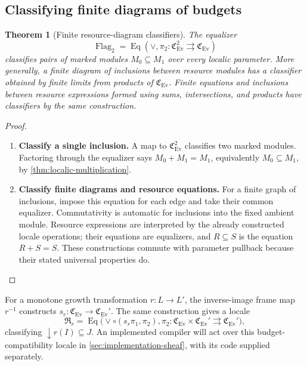 \documentclass[11pt,a4paper]{article}
\numberwithin{algorithm}{section}
\numberwithin{equation}{section}
\newtheorem{theorem}{Theorem}[section]
\theoremstyle{definition}
\theoremstyle{remark}
\theoremstyle{plain}
\newcommand{\Ev}{{\operatorname{Ev}}}
\newcommand{\Cplx}{\mathfrak C_{\Ev}}
\theoremstyle{definition}
\theoremstyle{plain}
\begin{document}
\subsection{Classifying finite diagrams of budgets}
\label{sec:budget-diagrams-moduli}
\begin{theorem}[Finite resource-diagram classifiers]
\label{thm:budget-flags}
The equalizer
\[
 \operatorname{Flag}_2=\operatorname{Eq}
   (\vee,\pi_2:\Cplx^2\rightrightarrows\Cplx)
\]
classifies pairs of marked modules $M_0\subseteq M_1$ over every
localic parameter. More generally, a finite diagram of inclusions
between resource modules has a classifier obtained by finite
limits from products of $\Cplx$. Finite equations and inclusions
between resource expressions formed using sums, intersections,
and products have classifiers by the same construction.
\end{theorem}
\begin{proof}\leavevmode
\begin{enumerate}[leftmargin=*,align=left]
\item \textbf{Classify a single inclusion.}
A map to $\Cplx^2$ classifies two marked modules. Factoring
through the equalizer says $M_0+M_1=M_1$, equivalently
$M_0\subseteq M_1$, by \cref{thm:localic-multiplication}.

\item \textbf{Classify finite diagrams and resource equations.}
For a finite graph of inclusions, impose this equation for each
edge and take their common equalizer. Commutativity is automatic
for inclusions into the fixed ambient module. Resource expressions
are interpreted by the already constructed locale operations;
their equations are equalizers, and $R\subseteq S$ is the
equation $R+S=S$. These constructions commute with parameter
pullback because their stated universal properties do.
\end{enumerate}
\end{proof}

For a monotone growth transformation $r:L\to L'$, the inverse-image
frame map $r^{-1}$ constructs $s_r:\Cplx\to\Cplx'$.
The same construction gives a locale
\begin{equation}\label{eq:compiler-budget-classifier}
 \mathfrak R_r=\operatorname{Eq}
 \bigl(\vee\circ(s_r\pi_1,\pi_2),\pi_2:
                 \Cplx\times\Cplx'\rightrightarrows\Cplx'\bigr),
\end{equation}
classifying $\downarrow r(I)\subseteq J$. An implemented compiler
will act over this budget-compatibility locale in
\cref{sec:implementation-sheaf}, with its code supplied separately.
\end{document}
